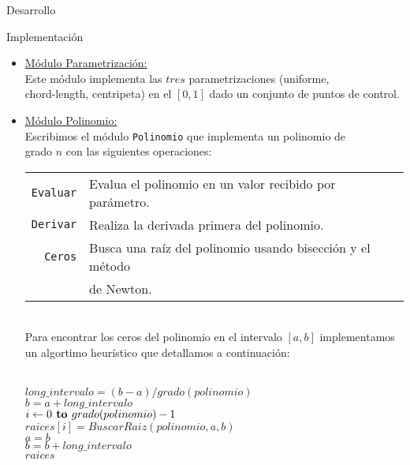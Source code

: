 \begin{section}{Desarrollo}
\begin{subsection}{Implementación}
		\begin{itemize}
			\item \underline{Módulo Parametrización:}\\
				Este módulo implementa las $tres$ parametrizaciones (uniforme,\\
				chord-length, centripeta) en el $[0,1]$ dado un conjunto de puntos de control.
			\item \underline{Módulo Polinomio:}\\
				Escribimos el módulo \texttt{Polinomio} que implementa un polinomio de\\
				grado $n$ con las siguientes operaciones:\\
				
				\begin{tabular}{rl}
					\texttt{Evaluar} & Evalua el polinomio en un valor recibido por parámetro.\\
					\texttt{Derivar} & Realiza la derivada primera del polinomio.\\
					\texttt{Ceros}   & Busca una raíz del polinomio usando bisección y el método\\
									 & de Newton.\\
				\end{tabular}\\ 
				
				Para encontrar los ceros del polinomio en el intervalo $[a,b]$ implementamos un algortimo heurístico que detallamos a continuación:\\
				
				\begin{pseudo}
					\\
					\tab $long\_intervalo = (b-a)/grado(polinomio)$\\
					\tab $b = a+long\_intervalo$\\
					\tab \FOR $i\gets 0 \textbf{ to } grado(polinomio)-1$\\
					\tab\tab\tab $raices[i] = BuscarRaiz(polinomio,a,b)$\\
					\tab\tab\tab $a = b$\\
					\tab\tab\tab $b = b + long\_intervalo$\\
					\tab \RET $raices$\\
				\end{pseudo}
		

\end{itemize}
\end{subsection}
\end{section}
